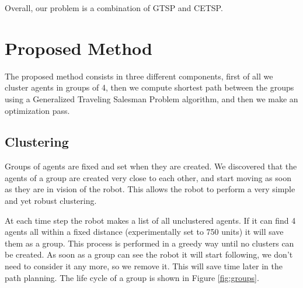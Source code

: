 \documentclass[]{article}
\begin{document}
Overall, our problem is a combination of GTSP and CETSP.

\section{Proposed Method}
The proposed method consists in three different components, first of all we cluster agents in groups of 4, then we compute shortest path between the groups using a Generalized Traveling Salesman Problem algorithm, and then we make an optimization pass.

\subsection{Clustering}
Groups of agents are fixed and set when they are created. We discovered that the agents of a group are created very close to each other, and start moving as soon as they are in vision of the robot. This allows the robot to perform a very simple and yet robust clustering. 

At each time step the robot makes a list of all unclustered agents. If it can find 4 agents all within a fixed distance (experimentally set to 750 units) it will save them as a group. This process is performed in a greedy way until no clusters can be created. As soon as a group can see the robot it will start following, we don't need to consider it any more, so we remove it. This will save time later in the path planning. The life cycle of a group is shown in Figure \ref{fig:groups}.
\end{document}
